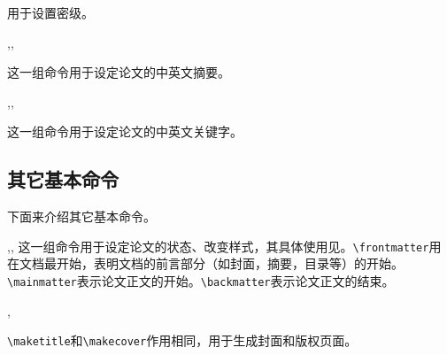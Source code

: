 \documentclass[12pt,a4paper,numbered,full]{l3doc}
\begin{document}
\begin{function}{\secretlevel}
    \begin{syntax}
    \end{syntax}
    用于设置密级。
\end{function}

\begin{function}{\zhabstract,\enabstract,\abstract}
    \begin{syntax}
    \end{syntax}
    这一组命令用于设定论文的中英文摘要。
\end{function}

\begin{function}{\zhkeywords,\enkeywords,\keywords}
    \begin{syntax}
    \end{syntax}
    这一组命令用于设定论文的中英文关键字。
\end{function}

\subsection{其它基本命令}

下面来介绍其它基本命令。

\begin{function}{\frontmatter,\mainmatter,\backmatter}
    这一组命令用于设定论文的状态、改变样式，其具体使用见。\verb+\frontmatter+用在文档最开始，表明文档的前言部分（如封面，摘要，目录等）的开始。\verb+\mainmatter+表示论文正文的开始。\verb+\backmatter+表示论文正文的结束。
\end{function}

\begin{function}{\maketitle,\makecover}
    \verb+\maketitle+和\verb+\makecover+作用相同，用于生成封面和版权页面。
\end{function}
\end{document}
